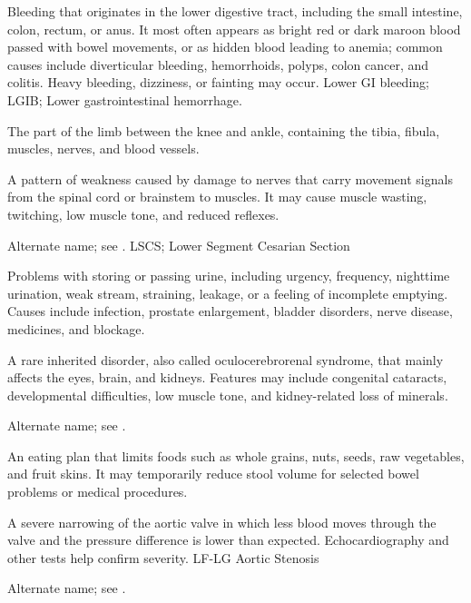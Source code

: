  Bleeding that originates in the lower digestive tract, including the small intestine, colon, rectum, or anus. It most often appears as bright red or dark maroon blood passed with bowel movements, or as hidden blood leading to anemia; common causes include diverticular bleeding, hemorrhoids, polyps, colon cancer, and colitis. Heavy bleeding, dizziness, or fainting may occur.
\synonyms Lower GI bleeding; LGIB; Lower gastrointestinal hemorrhage.

 The part of the limb between the knee and ankle, containing the tibia, fibula, muscles, nerves, and blood vessels.

 A pattern of weakness caused by damage to nerves that carry movement signals from the spinal cord or brainstem to muscles. It may cause muscle wasting, twitching, low muscle tone, and reduced reflexes.

 Alternate name; see .
\synonyms
LSCS; Lower Segment Cesarian Section

 Problems with storing or passing urine, including urgency, frequency, nighttime urination, weak stream, straining, leakage, or a feeling of incomplete emptying. Causes include infection, prostate enlargement, bladder disorders, nerve disease, medicines, and blockage.

 A rare inherited disorder, also called oculocerebrorenal syndrome, that mainly affects the eyes, brain, and kidneys. Features may include congenital cataracts, developmental difficulties, low muscle tone, and kidney-related loss of minerals.

 Alternate name; see .

 An eating plan that limits foods such as whole grains, nuts, seeds, raw vegetables, and fruit skins. It may temporarily reduce stool volume for selected bowel problems or medical procedures.

 A severe narrowing of the aortic valve in which less blood moves through the valve and the pressure difference is lower than expected. Echocardiography and other tests help confirm severity.
\synonyms
LF-LG Aortic Stenosis

 Alternate name; see .


